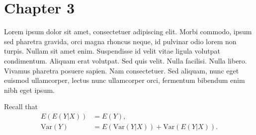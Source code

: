 \chapter{Chapter 3}

Lorem ipsum dolor sit amet, consectetuer adipiscing elit. Morbi commodo, ipsum sed pharetra gravida, orci magna rhoncus neque, id pulvinar odio lorem non turpis. Nullam sit amet enim. Suspendisse id velit vitae ligula volutpat condimentum. Aliquam erat volutpat. Sed quis velit. Nulla facilisi. Nulla libero. Vivamus pharetra posuere sapien. Nam consectetuer. Sed aliquam, nunc eget euismod ullamcorper, lectus nunc ullamcorper orci, fermentum bibendum enim nibh eget ipsum. 

Recall that 
\begin{align*} 
   E(E(Y|X)) &= E(Y), \\
    \textrm{Var}(Y) &= E(\textrm{Var}(Y|X)) + \textrm{Var}(E(Y|X)). \\
\end{align*}